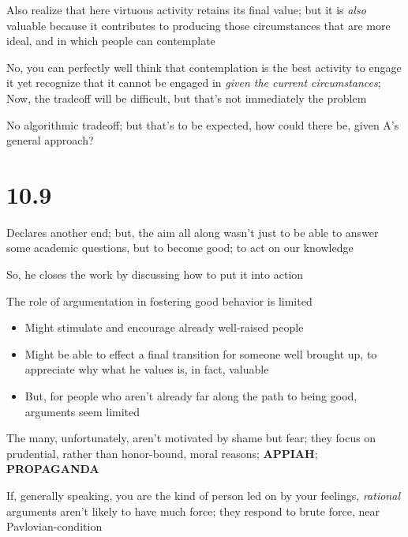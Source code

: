\documentclass[11pt]{article}
\begin{document}
\noindent [2] Also realize that here virtuous activity retains its final value; but it is \emph{also} valuable because it contributes to producing those circumstances that are more ideal, and in which people can contemplate
\vspace*{2mm}

\noindent [3] No, you can perfectly well think that contemplation is the best activity to engage it yet recognize that it cannot be engaged in \emph{given the current circumstances}; Now, the tradeoff will be difficult, but that's not immediately the problem
\vspace*{2mm}

\noindent [4] No algorithmic tradeoff; but that's to be expected, how could there be, given A's general approach?

\section{10.9}

\noindent Declares another end; but, the aim all along wasn't just to be able to answer some academic questions, but to become good; to act on our knowledge
\vspace*{2mm}

\noindent So, he closes the work by discussing how to put it into action
\vspace*{2mm}

\noindent The role of argumentation in fostering good behavior is limited

\begin{itemize}\item{Might stimulate and encourage already well-raised people}\item{Might be able to effect a final transition for someone well brought up, to appreciate why what he values is, in fact, valuable}\item{But, for people who aren't already far along the path to being good, arguments seem limited}\end{itemize}

\noindent The many, unfortunately, aren't motivated by shame but fear; they focus on prudential, rather than honor-bound, moral reasons; \textbf{APPIAH}; \textbf{PROPAGANDA}
\vspace*{2mm}

\noindent If, generally speaking, you are the kind of person led on by your feelings, \emph{rational} arguments aren't likely to have much force; they respond to brute force, near Pavlovian-condition
\vspace*{2mm}
\end{document}
